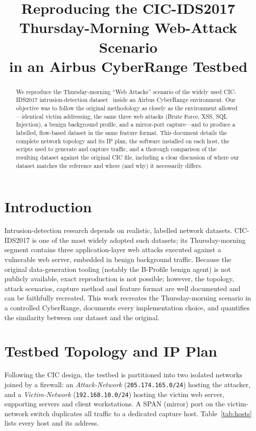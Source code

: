\documentclass[11pt]{article}
\title{Reproducing the CIC-IDS2017 Thursday-Morning Web-Attack Scenario\\in an Airbus CyberRange Testbed}
\author{}
\date{}
\begin{document}
\maketitle

\begin{abstract}
We reproduce the Thursday-morning ``Web Attacks'' scenario of the widely used
CIC-IDS2017 intrusion-detection dataset~\cite{sharafaldin2018} inside an Airbus
CyberRange environment. Our objective was to follow the original methodology as
closely as the environment allowed---identical victim addressing, the same three
web attacks (Brute Force, XSS, SQL Injection), a benign background profile, and a
mirror-port capture---and to produce a labelled, flow-based dataset in the same
feature format. This document details the complete network topology and its IP
plan, the software installed on each host, the scripts used to generate and
capture traffic, and a thorough comparison of the resulting dataset against the
original CIC file, including a clear discussion of where our dataset matches the
reference and where (and why) it necessarily differs.
\end{abstract}

\section{Introduction}
Intrusion-detection research depends on realistic, labelled network datasets.
CIC-IDS2017 is one of the most widely adopted such datasets; its Thursday-morning
segment contains three application-layer web attacks executed against a
vulnerable web server, embedded in benign background traffic. Because the
original data-generation tooling (notably the B-Profile benign agent) is not
publicly available, exact reproduction is not possible; however, the topology,
attack scenarios, capture method and feature format are well documented and can
be faithfully recreated. This work recreates the Thursday-morning scenario in a
controlled CyberRange, documents every implementation choice, and quantifies the
similarity between our dataset and the original.

\section{Testbed Topology and IP Plan}
Following the CIC design, the testbed is partitioned into two isolated networks
joined by a firewall: an \emph{Attack-Network} (\texttt{205.174.165.0/24}) hosting
the attacker, and a \emph{Victim-Network} (\texttt{192.168.10.0/24}) hosting the
victim web server, supporting servers and client workstations. A SPAN (mirror)
port on the victim-network switch duplicates all traffic to a dedicated capture
host. Table~\ref{tab:hosts} lists every host and its address.
\end{document}

